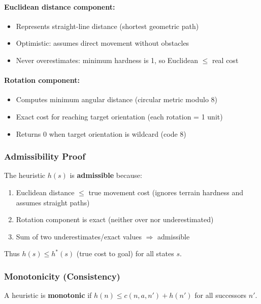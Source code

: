 \documentclass[11pt,a4paper]{article}
\begin{document}
\paragraph{Euclidean distance component:}
\begin{itemize}[leftmargin=1.5cm,itemsep=0.1em]
    \item Represents straight-line distance (shortest geometric path)
    \item Optimistic: assumes direct movement without obstacles
    \item Never overestimates: minimum hardness is 1, so Euclidean $\leq$ real cost
\end{itemize}

\paragraph{Rotation component:}
\begin{itemize}[leftmargin=1.5cm,itemsep=0.1em]
    \item Computes minimum angular distance (circular metric modulo 8)
    \item Exact cost for reaching target orientation (each rotation = 1 unit)
    \item Returns 0 when target orientation is wildcard (code 8)
\end{itemize}

\subsubsection{Admissibility Proof}
The heuristic $h(s)$ is \textbf{admissible} because:
\begin{enumerate}[leftmargin=1.5cm,itemsep=0.1em]
    \item Euclidean distance $\leq$ true movement cost (ignores terrain hardness and assumes straight paths)
    \item Rotation component is exact (neither over nor underestimated)
    \item Sum of two underestimates/exact values $\Rightarrow$ admissible
\end{enumerate}
Thus $h(s) \leq h^*(s)$ (true cost to goal) for all states $s$.

\subsubsection{Monotonicity (Consistency)}
A heuristic is \textbf{monotonic} if $h(n) \leq c(n, a, n') + h(n')$ for all successors $n'$.
\end{document}
